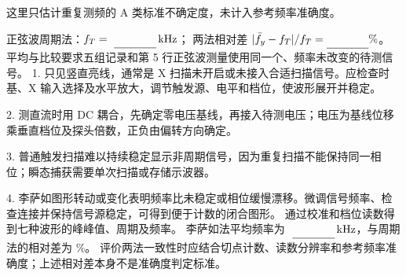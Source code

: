 这里只估计重复测频的 A 类标准不确定度，未计入参考频率准确度。
\par 正弦波周期法：$f_T=\MathField{sine_frequency_khz}\,\mathrm{kHz}$；
两法相对差 $|\bar f_y-f_T|/f_T=\Field{method_difference_percent}\%$。
平均与比较要求五组记录和第 5 行正弦波测量使用同一个、频率未改变的待测信号。
1. 只见竖直亮线，通常是 X 扫描未开启或未接入合适扫描信号。应检查时基、X 输入选择及水平放大，调节触发源、电平和档位，使波形展开并稳定。\par
2. 测直流时用 DC 耦合，先确定零电压基线，再接入待测电压；电压为基线位移乘垂直档位及探头倍数，正负由偏转方向确定。\par
3. 普通触发扫描难以持续稳定显示非周期信号，因为重复扫描不能保持同一相位；瞬态捕获需要单次扫描或存储示波器。\par
4. 李萨如图形转动或变化表明频率比未稳定或相位缓慢漂移。微调信号频率、检查连接并保持信号源稳定，可得到便于计数的闭合图形。
通过校准和档位读数得到七种波形的峰峰值、周期及频率。
李萨如法平均频率为 $\MathField{lissajous_mean_khz}\,\mathrm{kHz}$，与周期法的相对差为 \%。
评价两法一致性时应结合切点计数、读数分辨率和参考频率准确度；上述相对差本身不是准确度判定标准。

\ReportRecord

